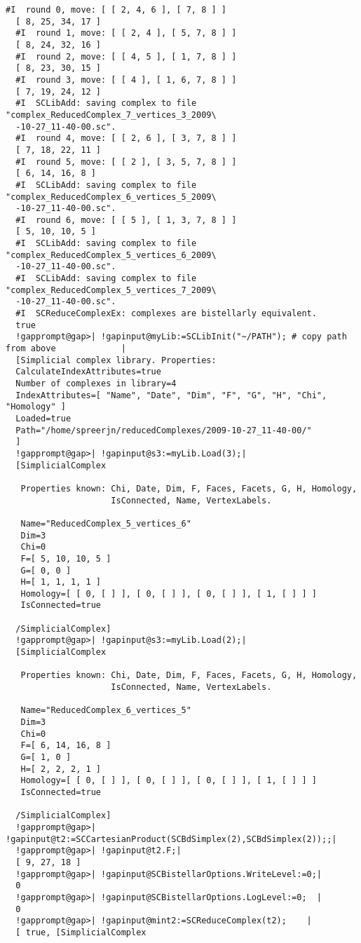 \documentclass[a4paper,11pt]{report}
\begin{document}
{{\begin{Verbatim}[commandchars=!@|,fontsize=\small,frame=single,label=Example]
  #I  round 0, move: [ [ 2, 4, 6 ], [ 7, 8 ] ]
  [ 8, 25, 34, 17 ]
  #I  round 1, move: [ [ 2, 4 ], [ 5, 7, 8 ] ]
  [ 8, 24, 32, 16 ]
  #I  round 2, move: [ [ 4, 5 ], [ 1, 7, 8 ] ]
  [ 8, 23, 30, 15 ]
  #I  round 3, move: [ [ 4 ], [ 1, 6, 7, 8 ] ]
  [ 7, 19, 24, 12 ]
  #I  SCLibAdd: saving complex to file "complex_ReducedComplex_7_vertices_3_2009\
  -10-27_11-40-00.sc".
  #I  round 4, move: [ [ 2, 6 ], [ 3, 7, 8 ] ]
  [ 7, 18, 22, 11 ]
  #I  round 5, move: [ [ 2 ], [ 3, 5, 7, 8 ] ]
  [ 6, 14, 16, 8 ]
  #I  SCLibAdd: saving complex to file "complex_ReducedComplex_6_vertices_5_2009\
  -10-27_11-40-00.sc".
  #I  round 6, move: [ [ 5 ], [ 1, 3, 7, 8 ] ]
  [ 5, 10, 10, 5 ]
  #I  SCLibAdd: saving complex to file "complex_ReducedComplex_5_vertices_6_2009\
  -10-27_11-40-00.sc".
  #I  SCLibAdd: saving complex to file "complex_ReducedComplex_5_vertices_7_2009\
  -10-27_11-40-00.sc".
  #I  SCReduceComplexEx: complexes are bistellarly equivalent.
  true
  !gapprompt@gap>| !gapinput@myLib:=SCLibInit("~/PATH"); # copy path from above             |
  [Simplicial complex library. Properties:
  CalculateIndexAttributes=true
  Number of complexes in library=4
  IndexAttributes=[ "Name", "Date", "Dim", "F", "G", "H", "Chi", "Homology" ]
  Loaded=true
  Path="/home/spreerjn/reducedComplexes/2009-10-27_11-40-00/"
  ]
  !gapprompt@gap>| !gapinput@s3:=myLib.Load(3);|
  [SimplicialComplex
  
   Properties known: Chi, Date, Dim, F, Faces, Facets, G, H, Homology, 
                     IsConnected, Name, VertexLabels.
  
   Name="ReducedComplex_5_vertices_6"
   Dim=3
   Chi=0
   F=[ 5, 10, 10, 5 ]
   G=[ 0, 0 ]
   H=[ 1, 1, 1, 1 ]
   Homology=[ [ 0, [ ] ], [ 0, [ ] ], [ 0, [ ] ], [ 1, [ ] ] ]
   IsConnected=true
  
  /SimplicialComplex]
  !gapprompt@gap>| !gapinput@s3:=myLib.Load(2);|
  [SimplicialComplex
  
   Properties known: Chi, Date, Dim, F, Faces, Facets, G, H, Homology, 
                     IsConnected, Name, VertexLabels.
  
   Name="ReducedComplex_6_vertices_5"
   Dim=3
   Chi=0
   F=[ 6, 14, 16, 8 ]
   G=[ 1, 0 ]
   H=[ 2, 2, 2, 1 ]
   Homology=[ [ 0, [ ] ], [ 0, [ ] ], [ 0, [ ] ], [ 1, [ ] ] ]
   IsConnected=true
  
  /SimplicialComplex]
  !gapprompt@gap>| !gapinput@t2:=SCCartesianProduct(SCBdSimplex(2),SCBdSimplex(2));;|
  !gapprompt@gap>| !gapinput@t2.F;|
  [ 9, 27, 18 ]
  !gapprompt@gap>| !gapinput@SCBistellarOptions.WriteLevel:=0;|
  0
  !gapprompt@gap>| !gapinput@SCBistellarOptions.LogLevel:=0;  |
  0
  !gapprompt@gap>| !gapinput@mint2:=SCReduceComplex(t2);    |
  [ true, [SimplicialComplex
      

\end{Verbatim}}}
\end{document}
